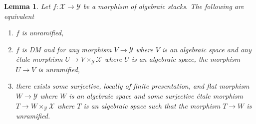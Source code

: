 \documentclass{stacks-project}
\theoremstyle{plain}
\newtheorem{lemma}[subsection]{Lemma}
\theoremstyle{definition}
\theoremstyle{remark}
\numberwithin{equation}{subsection}
\begin{document}
\begin{lemma}
\label{lemma-unramified}
Let $f : \mathcal{X} \to \mathcal{Y}$ be a morphism of algebraic stacks.
The following are equivalent
\begin{enumerate}
\item $f$ is unramified,
\item $f$ is DM and for any morphism $V \to \mathcal{Y}$
where $V$ is an algebraic space and any \'etale morphism
$U \to V \times_\mathcal{Y} \mathcal{X}$ where $U$ is an algebraic space,
the morphism $U \to V$ is unramified,
\item there exists some surjective, locally of finite presentation, and flat
morphism $W \to \mathcal{Y}$ where $W$ is an algebraic space and some
surjective \'etale morphism $T \to W \times_\mathcal{Y} \mathcal{X}$
where $T$ is an algebraic space such that the morphism $T \to W$ is unramified.
\end{enumerate}
\end{lemma}
\end{document}
